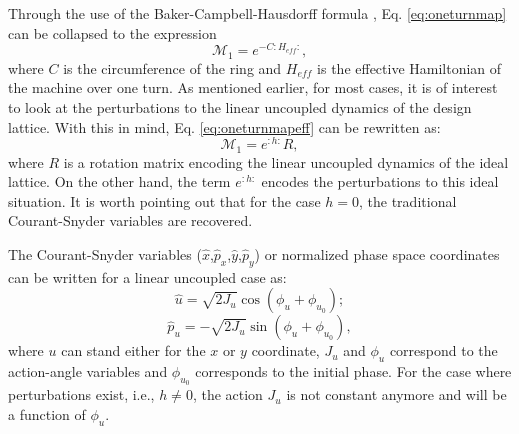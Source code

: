 Through the use of the Baker-Campbell-Hausdorff formula , Eq. \ref{eq:oneturnmap} can be collapsed to the expression 
\begin{equation}
    \label{eq:oneturnmapeff}
    \mathcal{M}_1=e^{-C :H_{eff}:},
\end{equation}
where $C$ is the circumference of the ring and $H_{eff}$ is the effective Hamiltonian of the machine over one turn. As mentioned earlier, for most cases, it is of interest to look at the perturbations to the linear uncoupled dynamics of the design lattice. With this in mind, Eq. \ref{eq:oneturnmapeff} can be rewritten as:
\begin{equation}
    \label{eq:oneturnmapeff1}
    \mathcal{M}_1=e^{:h:}R,
\end{equation}
where $R$ is a rotation matrix encoding the linear uncoupled dynamics of the ideal lattice. On the other hand, the term $e^{:h:}$ encodes the perturbations to this ideal situation. It is worth pointing out that for the case $h=0$, the traditional Courant-Snyder variables are recovered.   

The Courant-Snyder variables ($\hat{x}$,$\hat{p}_x$,$\hat{y}$,$\hat{p}_y$) or normalized phase space coordinates can be written for a linear uncoupled case as:
\begin{equation}
    \label{eq:norm1}
    \hat{u}=\sqrt{2J_u} \cos \left( \phi_u + \phi_{u_0}\right);
\end{equation}
\begin{equation}
    \label{eq:norm2}
    \hat{p}_u=-\sqrt{2J_u} \sin \left( \phi_u + \phi_{u_0}\right),
\end{equation}
where $u$ can stand either for the $x$ or $y$ coordinate, $J_u$ and $\phi_u$ correspond to the action-angle variables and $\phi_{u_0}$ corresponds to the initial phase. For the case where perturbations exist, i.e., $h \neq 0$, the action $J_u$ is not constant anymore and will be a function of $\phi_u$.  

